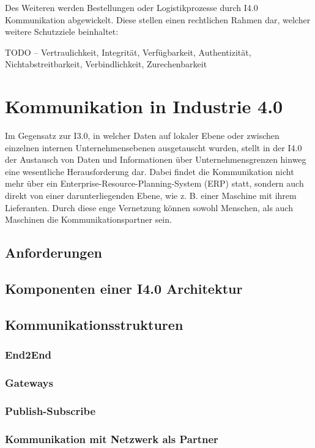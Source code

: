 Des Weiteren werden Bestellungen oder Logistikprozesse durch I4.0 Kommunikation abgewickelt. Diese stellen einen rechtlichen Rahmen dar, welcher weitere Schutzziele beinhaltet:

TODO – Vertraulichkeit, Integrität, Verfügbarkeit, Authentizität, Nichtabstreitbarkeit, Verbindlichkeit, Zurechenbarkeit


\section{Kommunikation in Industrie 4.0}
Im Gegensatz zur I3.0, in welcher Daten auf lokaler Ebene oder zwischen einzelnen internen Unternehmensebenen ausgetauscht wurden, stellt in der I4.0 der Austausch von Daten und Informationen über Unternehmensgrenzen hinweg eine wesentliche Herausforderung dar. Dabei findet die Kommunikation nicht mehr über ein Enterprise-Resource-Planning-System (ERP) statt, sondern auch direkt von einer darunterliegenden Ebene, wie z. B. einer Maschine mit ihrem Lieferanten. Durch diese enge Vernetzung können sowohl Menschen, als auch Maschinen die Kommunikationspartner sein.

\subsection{Anforderungen}
\subsection{Komponenten einer I4.0 Architektur}
\subsection{Kommunikationsstrukturen}
\subsubsection{End2End}
\subsubsection{Gateways}
\subsubsection{Publish-Subscribe}
\subsubsection{Kommunikation mit Netzwerk als Partner}